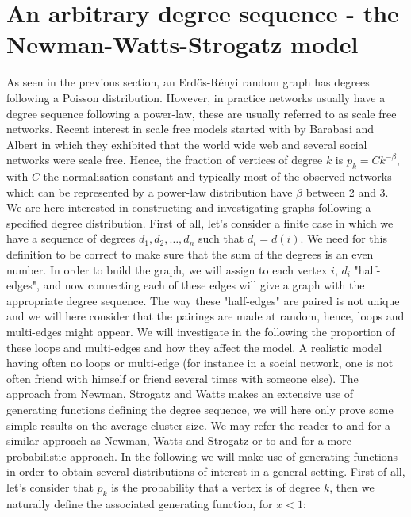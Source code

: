 \section{An arbitrary degree sequence - the Newman-Watts-Strogatz model}
As seen in the previous section, an Erd\"os-R\'enyi random graph has degrees following a Poisson distribution. 
However, in practice networks usually have a degree sequence following a power-law, these are usually referred to as scale free networks.
Recent interest in scale free models started with \cite{Barabasi99} by Barabasi and Albert in which they exhibited that the world wide web and several social networks were scale free.
Hence, the fraction of vertices of degree $k$ is $p_k = Ck^{-\beta}$, with $C$ the normalisation constant and typically most of the observed networks which can be represented by a power-law distribution have $\beta$ between 2 and 3.
We are here interested in constructing and investigating graphs following a specified degree distribution.
\newline
First of all, let's consider a finite case in which we have a sequence of degrees $d_1, d_2, \ldots, d_n$ such that $d_i = d(i)$.
We need for this definition to be correct to make sure that the sum of the degrees is an even number.
In order to build the graph, we will assign to each vertex $i$, $d_i$ "half-edges", and now connecting each of these edges will give a graph with the appropriate degree sequence.
The way these "half-edges" are paired is not unique and we will here consider that the pairings are made at random, hence, loops and multi-edges might appear.
We will investigate in the following the proportion of these loops and multi-edges and how they affect the model. 
A realistic model having often no loops or multi-edge (for instance in a social network, one is not often friend with himself or friend several times with someone else).
\newline
The approach from Newman, Strogatz and Watts \cite{Newman01} makes an extensive use of generating functions defining the degree sequence, we will here only prove some simple results on the average cluster size. We may refer the reader to \cite{Hofstad16} and \cite{Durrett06} for a similar approach as Newman, Watts and Strogatz
or to \cite{Molloy95} and\cite{frieze15} for a more probabilistic approach. 
In the following we will make use of generating functions in order to obtain several distributions of interest in a general setting. 
First of all, let's consider that $p_k$ is the probability that a vertex is of degree $k$, then we naturally define the associated generating function, for $x<1$:
